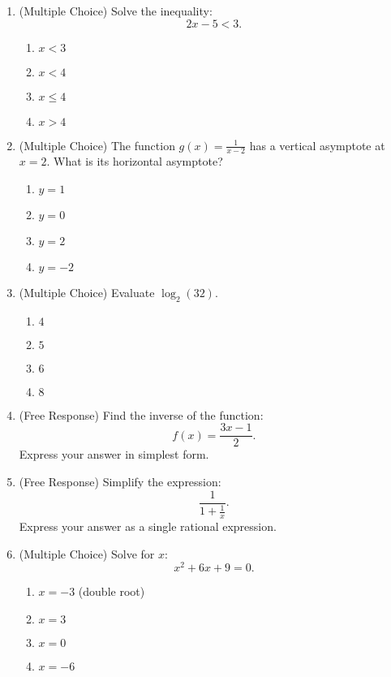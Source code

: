 \documentclass[12pt]{article}
\begin{document}
\begin{enumerate}[label=\textbf{Question \arabic*:}]
  \item (Multiple Choice) Solve the inequality:
    \[
    2x - 5 < 3.
    \]
    \begin{enumerate}[label=(\Alph*)]
      \item \(x < 3\)
      \item \(x < 4\)
      \item \(x \le 4\)
      \item \(x > 4\)
    \end{enumerate}
    
  \item (Multiple Choice) The function \( g(x)=\frac{1}{x-2} \) has a vertical asymptote at \( x=2 \). What is its horizontal asymptote?
    \begin{enumerate}[label=(\Alph*)]
      \item \(y = 1\)
      \item \(y = 0\)
      \item \(y = 2\)
      \item \(y = -2\)
    \end{enumerate}
    
  \item (Multiple Choice) Evaluate \(\log_2(32)\).
    \begin{enumerate}[label=(\Alph*)]
      \item \(4\)
      \item \(5\)
      \item \(6\)
      \item \(8\)
    \end{enumerate}
    
  \item (Free Response) Find the inverse of the function:
    \[
    f(x)=\frac{3x-1}{2}.
    \]
    Express your answer in simplest form.
    
  \item (Free Response) Simplify the expression:
    \[
    \frac{1}{1+\frac{1}{x}}.
    \]
    Express your answer as a single rational expression.

    \item (Multiple Choice) Solve for \(x\):
    \[
    x^2 + 6x + 9 = 0.
    \]
    \begin{enumerate}[label=(\Alph*)]
      \item \(x = -3\) (double root)
      \item \(x = 3\)
      \item \(x = 0\)
      \item \(x = -6\)
    \end{enumerate}
    

\end{enumerate}
\end{document}
